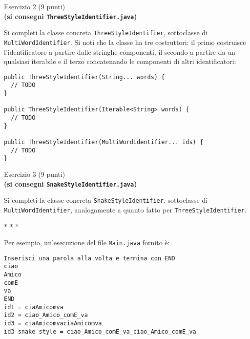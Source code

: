 \documentclass[12pt]{article}
\begin{document}
\vspace*{1ex}
\begin{center}{\Large Esercizio 2} ($9$ punti)\\
  \textbf{(si consegni \texttt{ThreeStyleIdentifier.java})}
\end{center}

Si completi la classe concreta \texttt{ThreeStyleIdentifier}, sottoclasse
di \texttt{MultiWordIdentifier}. Si noti che la classe ha tre costruttori:
il primo costruisce l'identificatore a partire dalle stringhe componenti,
il secondo a partire da un qualsiasi iterabile e il terzo concatenando le
componenti di altri identificatori:

{\small\begin{verbatim}
public ThreeStyleIdentifier(String... words) {
  // TODO
}

public ThreeStyleIdentifier(Iterable<String> words) {
  // TODO
}

public ThreeStyleIdentifier(MultiWordIdentifier... ids) {
  // TODO
}
\end{verbatim}}

\vspace*{1ex}
\begin{center}{\Large Esercizio 3} ($9$ punti)\\
  \textbf{(si consegni \texttt{SnakeStyleIdentifier.java})}
\end{center}

Si completi la classe concreta \texttt{SnakeStyleIdentifier}, sottoclasse
di \texttt{MultiWordIdentifier}, analogamente a quanto fatto per
\texttt{ThreeStyleIdentifier}.

\begin{center}
  * * *
\end{center}

Per esempio, un'esecuzione del file \texttt{Main.java} fornito \`e:

\begin{mdframed}[backgroundcolor=lightgrey] 
\begin{verbatim}
Inserisci una parola alla volta e termina con END
ciao
Amico
comE
va
END
id1 = ciaAmicomva
id2 = ciao_Amico_comE_va
id3 = ciaAmicomvaciaAmicomva
id3 snake style = ciao_Amico_comE_va_ciao_Amico_comE_va
\end{verbatim}
\end{mdframed}
\end{document}
